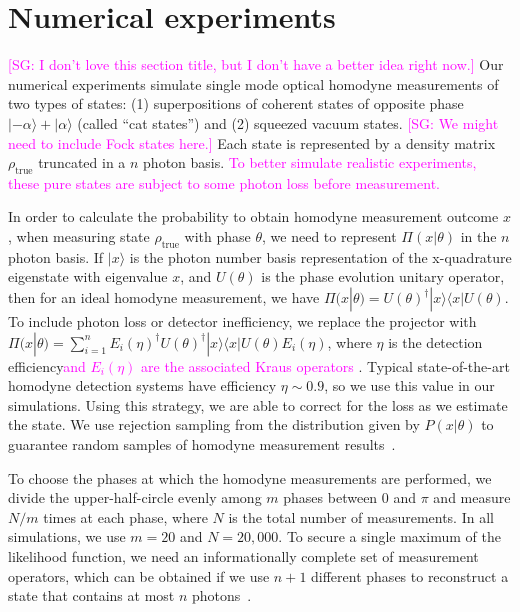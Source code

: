 \documentclass[
reprint,
superscriptaddress,
showpacs,
amsmath,
amssymb,
aps,
pra,
longbibliography
]{revtex4-1}
\providecommand{\aucmnt}[1]{#1}
\providecommand{\editcolor}[2]{\textcolor{#1}{#2}}
\providecommand{\aucmnt}[1]{}
\providecommand{\editcolor}[2]{#2}
\newcommand{\SG}[1]{\editcolor{magenta}{#1}}
\newcommand{\SGc}[1]{\aucmnt{\editcolor{magenta}{[SG: #1]}}}
\begin{document}
\section{Numerical experiments}
\label{numerical-experiments}
\SGc{I don't love this section title, but I don't have a better idea
  right now.}  Our numerical experiments simulate single mode optical
homodyne measurements of two types of states: (1) superpositions of
coherent states of opposite phase $|-\alpha\rangle + |\alpha\rangle$
(called ``cat states'') and (2) squeezed vacuum states. \SGc{We might
  need to include Fock states here.} Each state is represented by a
density matrix $\rho_{\mathrm{true}}$ truncated in a $n$ photon basis.
\SG{To better simulate realistic experiments, these pure states are
  subject to some photon loss before measurement.}

In order to calculate the probability to obtain homodyne measurement
outcome $x$, when measuring state $\rho_{\mathrm{true}}$ with phase
$\theta$, we need to represent $\Pi (x|\theta)$ in the $n$ photon
basis. If $|x\rangle$ is the photon number basis representation of the
x-quadrature eigenstate with eigenvalue $x$, and $U(\theta)$ is the
phase evolution unitary operator, then for an ideal homodyne
measurement, we have
$\Pi(x|\theta) = U(\theta)^{\dagger} |x\rangle \langle x|
U(\theta)$. To include photon loss or detector inefficiency, we
replace the projector with
$\Pi(x|\theta) = \sum_{i=1}^{n} E_i(\eta)^{\dagger}
U(\theta)^{\dagger} |x\rangle \langle x| U(\theta) E_i(\eta)$, where
$\eta$ is the detection efficiency\SG{and $E_i(\eta)$ are the
  associated Kraus operators \cite{Lvovsky2004}}.  Typical
state-of-the-art homodyne detection systems have efficiency
$\eta \sim 0.9$, so we use this value in our simulations. Using this
strategy, we are able to correct for the loss as we estimate the
state. We use rejection sampling from the distribution given by
$P(x|\theta)$ to guarantee random samples of homodyne measurement
results~\cite{Kennedy1980}.

To choose the phases at which the homodyne measurements are performed,
we divide the upper-half-circle evenly among $m$ phases between 0 and
$\pi$ and measure $N/m$ times at each phase, where $N$ is the total
number of measurements. In all simulations, we use $m=20$ and
$N = 20,000$. To secure a single maximum of the likelihood function,
we need an informationally complete set of measurement operators,
which can be obtained if we use $n+1$ different phases to reconstruct
a state that contains at most $n$ photons~\cite{Leonhardt1997}.
\end{document}
